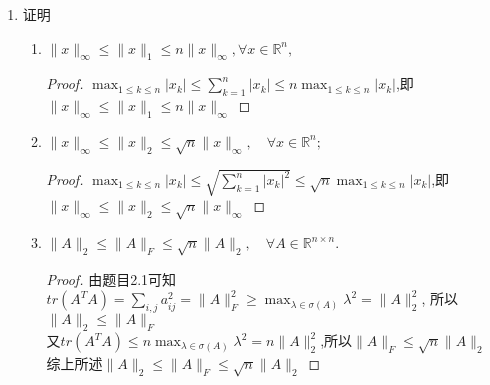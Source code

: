 \documentclass[a4paper]{article}
\begin{document}
\begin{enumerate}
  \item 证明
  \begin{enumerate}[label=（\arabic*）]
    \item $\| x \|_\infty \leqslant \| x \|_1 \leqslant n \| x \|_\infty, \forall x \in \mathbb{R}^n,$
    \begin{proof}
      $\max_{1\leq k\leq n}|x_k|\le \sum_{k=1}^n|x_k| \le n\max_{1\leq k\leq n}|x_k|$,即$\| x \|_\infty \leqslant \| x \|_1 \leqslant n \| x \|_\infty$
    \end{proof}
    \item $\| x \|_{\infty} \leqslant \| x \|_{2} \leqslant \sqrt{n} \| x \|_{\infty}, \quad \forall x \in \mathbb{R}^{n};$
    \begin{proof}
      $\max_{1\leq k\leq n}|x_k|\le \sqrt{\sum_{k=1}^n|x_k|^2} \le \sqrt{n}\max_{1\leq k\leq n}|x_k|$,即$\| x \|_{\infty} \leqslant \| x \|_{2} \leqslant \sqrt{n} \| x \|_{\infty}$
    \end{proof}
    \item $\|A\|_2 \leqslant \|A\|_F \leqslant \sqrt{n} \|A\|_2, \quad \forall A \in \mathbb{R}^{n \times n}.$
    \begin{proof}
      由题目2.1可知$tr(A^TA)=\sum_{i,j}a_{ij}^2=\|A\|_F^2\ge \max_{\lambda\in\sigma(A)}\lambda^2=\|A\|_{2}^2$, 所以$\|A\|_{2}\le\|A\|_{F}$\\
      又$tr(A^TA)\le n\max_{\lambda\in\sigma(A)}\lambda^2=n\|A\|_{2}^2$,所以$\|A\|_{F}\le \sqrt{n}\|A\|_{2}$\\
      综上所述$\|A\|_2 \leqslant \|A\|_F \leqslant \sqrt{n} \|A\|_2$
    \end{proof}
  \end{enumerate}


\end{enumerate}
\end{document}
